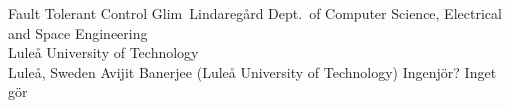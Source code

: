 \documentclass[12pt,a4paper,openright,final,twoside]{cseethesis}
\begin{document}
\def\thesistitle{Fault Tolerant Control}

\def\theauthor{Glim\ Lindaregård}
\def\theaddress{Dept.\ of Computer Science, Electrical and Space Engineering\\
Lule{\aa} University of Technology\\ Lule{\aa}, Sweden}

\def\supervisors{Avijit Banerjee (Luleå University of Technology)}
\def\supervisorstring{Supervisors:} %
\def\dedication{Ingenjör? Inget gör}

\def\theabstract{}
\def\thepreface{}



\def\thelogo{} %


\startpreamble
  {\thesistitle}
  {\theauthor}
  {\theaddress}
  {\supervisors}
  {\dedication}
  {\theabstract}
  {\thepreface}
  {\thelogo}

\end{document}
